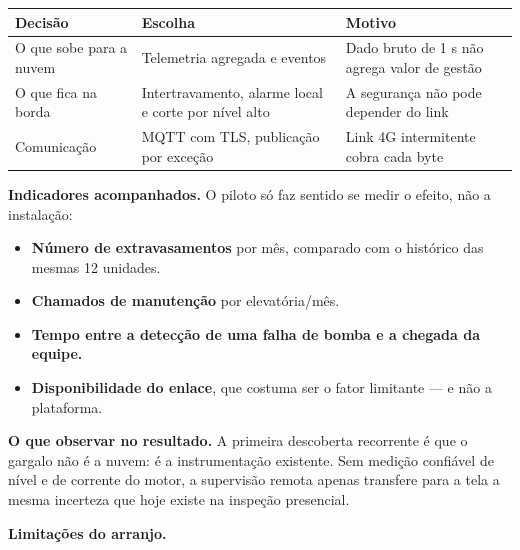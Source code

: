 \begin{longtable}[]{@{}
  >{\raggedright\arraybackslash}p{}
  >{\raggedright\arraybackslash}p{}
  >{\raggedright\arraybackslash}p{}@{}}
\toprule\noalign{}
\begin{minipage}[b]{\linewidth}\raggedright
Decisão
\end{minipage} & \begin{minipage}[b]{\linewidth}\raggedright
Escolha
\end{minipage} & \begin{minipage}[b]{\linewidth}\raggedright
Motivo
\end{minipage} \\
\midrule\noalign{}
\endhead
\bottomrule\noalign{}
\endlastfoot
O que sobe para a nuvem & Telemetria agregada e eventos & Dado bruto de 1 s não agrega valor de gestão \\
O que fica na borda & Intertravamento, alarme local e corte por nível alto & A segurança não pode depender do link \\
Comunicação & MQTT com TLS, publicação por exceção & Link 4G intermitente cobra cada byte \\
\end{longtable}

\textbf{Indicadores acompanhados.} O piloto só faz sentido se medir o efeito, não a instalação:

\begin{itemize}
\tightlist
\item
  \textbf{Número de extravasamentos} por mês, comparado com o histórico das mesmas 12 unidades.
\item
  \textbf{Chamados de manutenção} por elevatória/mês.
\item
  \textbf{Tempo entre a detecção de uma falha de bomba e a chegada da equipe.}
\item
  \textbf{Disponibilidade do enlace}, que costuma ser o fator limitante --- e não a plataforma.
\end{itemize}

\textbf{O que observar no resultado.} A primeira descoberta recorrente é que o gargalo não é a nuvem: é
a instrumentação existente. Sem medição confiável de nível e de corrente do motor, a supervisão
remota apenas transfere para a tela a mesma incerteza que hoje existe na inspeção presencial.

\textbf{Limitações do arranjo.}

